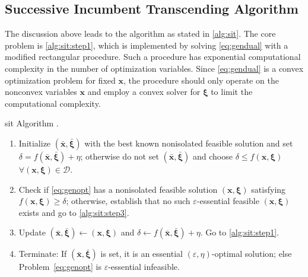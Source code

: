 \documentclass[a4paper,10pt,journal]{IEEEtran}
\let\vec\bm
\begin{document}
\subsection{Successive Incumbent Transcending Algorithm} \label{sec:sit}
The discussion above leads to the  algorithm as stated in \cref{alg:sit}.
The core problem is \ref{alg:sit:step1}, which is implemented by solving \cref{eq:gendual} with a modified rectangular  procedure.
Such a procedure has exponential computational complexity in the number of optimization variables. Since \cref{eq:gendual} is a convex optimization problem for fixed $\vec x$, the   procedure should only operate on the nonconvex variables $\vec x$ and employ a convex solver for $\vec\xi$ to limit the computational complexity.

\begin{algorithm}[tbh]
	\caption[\Acrshort{sit} Algorithm]{\Acrshort{sit} Algorithm \cite[\S 7.5.1]{Tuy2016}.}\label{alg:sit}
	\small
	\centering
	\begin{minipage}{\linewidth-.85em}
		\begin{enumerate}[label=\textbf{Step \arabic*},ref=Step~\arabic*,start=0,leftmargin=*]
			\item \label{alg:sit:step0} Initialize $(\bar{\vec x}, \bar{\vec\xi})$ with the best known nonisolated feasible solution and set $\delta = f(\bar{\vec x}, \bar{\vec\xi}) + \eta$; otherwise do not set $(\bar{\vec x}, \bar{\vec\xi})$ and choose  $\delta \le f(\vec x, \vec\xi)$ $\forall (\vec x, \vec\xi) \in \mathcal D$.
			\item\label{alg:sit:step1} Check if \cref{eq:genopt} has a nonisolated feasible solution $(\vec x, \vec\xi)$ satisfying $f(\vec x, \vec\xi) \ge \delta$; otherwise, establish that no such $\varepsilon$-essential feasible $(\vec x, \vec\xi)$ exists and go to \ref{alg:sit:step3}.
			\item Update $(\bar{\vec x}, \bar{\vec\xi}) \gets (\vec x, \vec\xi)$ and $\delta \gets f(\bar{\vec x}, \bar{\vec\xi}) + \eta$. Go to \ref{alg:sit:step1}.
			\item\label{alg:sit:step3} Terminate: If  $(\bar{\vec x}, \bar{\vec\xi})$ is set, it is an essential $(\varepsilon, \eta)$-optimal solution; else Problem~\eqref{eq:genopt} is $\varepsilon$-essential infeasible.
		\end{enumerate}
	\end{minipage}
\end{algorithm}
\end{document}
